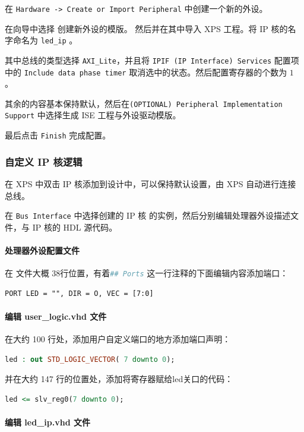 \documentclass{ctexart}
\begin{document}
在 \verb|Hardware -> Create or Import Peripheral| 中创建一个新的外设。

在向导中选择 创建新外设的模版。
然后并在其中导入 XPS 工程。将 IP 核的名字命名为 \verb|led_ip| 。

其中总线的类型选择 \verb|AXI_Lite|，并且将 \verb|IPIF (IP Interface) Services| 配置项中的 \verb|Include data phase timer| 取消选中的状态。然后配置寄存器的个数为 $1$ 。

其余的内容基本保持默认，然后在\verb|(OPTIONAL) Peripheral Implementation Support| 中选择生成 ISE 工程与外设驱动模版。

最后点击 \verb|Finish| 完成配置。

\subsubsection{自定义 IP 核逻辑}

在 XPS 中双击 IP 核添加到设计中，可以保持默认设置，由 XPS 自动进行连接总线。

在 \verb|Bus Interface| 中选择创建的 IP 核 的实例，然后分别编辑处理器外设描述文件，与 IP 核的 HDL 源代码。

\paragraph{处理器外设配置文件}

在 文件大概 38行位置，有着\lstinline[language=bash]|## Ports| 这一行注释的下面编辑内容添加端口：
\begin{lstlisting}
PORT LED = "", DIR = O, VEC = [7:0]
\end{lstlisting}

\paragraph{编辑 user\_logic.vhd 文件}

在大约 100 行处，添加用户自定义端口的地方添加端口声明：
\begin{lstlisting}[language=VHDL]
led : out STD_LOGIC_VECTOR( 7 downto 0);
\end{lstlisting}

并在大约 147 行的位置处，添加将寄存器赋给led关口的代码：
\begin{lstlisting}[language=VHDL]
led <= slv_reg0(7 downto 0);
\end{lstlisting}

\paragraph{编辑 led\_ip.vhd 文件}
\end{document}
